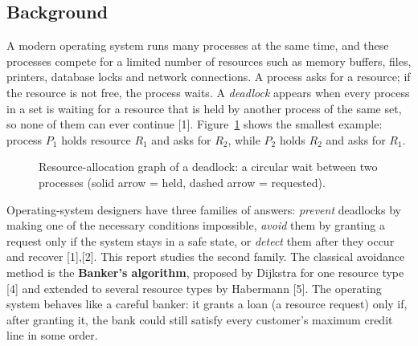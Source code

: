 \documentclass[11pt,a4paper]{report}
\begin{document}
\subsection{Background}
A modern operating system runs many processes at the same time, and these processes compete for a limited number of resources such as memory buffers, files, printers, database locks and network connections. A process asks for a resource; if the resource is not free, the process waits. A \emph{deadlock} appears when every process in a set is waiting for a resource that is held by another process of the same set, so none of them can ever continue [1]. Figure~\ref{fig:rag} shows the smallest example: process $P_1$ holds resource $R_1$ and asks for $R_2$, while $P_2$ holds $R_2$ and asks for $R_1$.

\begin{figure}[h!]
\centering
{}
\caption{Resource-allocation graph of a deadlock: a circular wait between two processes (solid arrow = held, dashed arrow = requested).}
\label{fig:rag}
\end{figure}

Operating-system designers have three families of answers: \emph{prevent} deadlocks by making one of the necessary conditions impossible, \emph{avoid} them by granting a request only if the system stays in a safe state, or \emph{detect} them after they occur and recover [1],[2]. This report studies the second family. The classical avoidance method is the \textbf{Banker's algorithm}, proposed by Dijkstra for one resource type [4] and extended to several resource types by Habermann [5]. The operating system behaves like a careful banker: it grants a loan (a resource request) only if, after granting it, the bank could still satisfy every customer's maximum credit line in some order.
\end{document}
